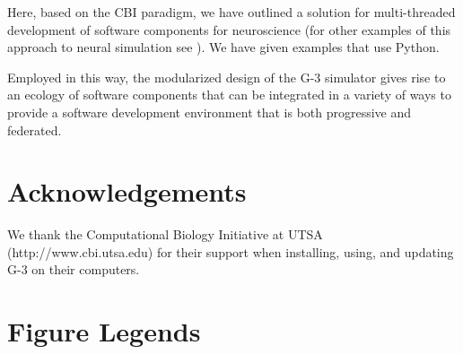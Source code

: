 \documentclass[10pt]{article}
\begin{document}
Here, based on the CBI paradigm, we have outlined a solution for
multi-threaded development of software components for neuroscience
(for other examples of this approach to neural simulation
see \cite{schuermann09:_neuron, nordlie09:_visual}).  We have given
examples that use Python.

Employed in this way, the modularized design of the G-3 simulator
gives rise to an ecology of software components that can be integrated
in a variety of ways to provide a software development environment
that is both progressive and federated.

\section*{\LARGE Acknowledgements}

We thank the Computational Biology Initiative at UTSA (http://www.cbi.utsa.edu) for their support when installing, using, and updating G-3 on their computers.



\newpage 



\newpage

\section*{\LARGE Figure Legends}

\end{document}
